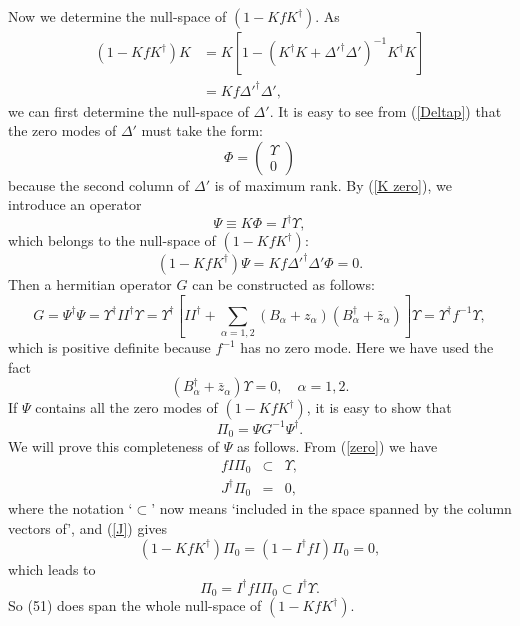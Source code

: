\documentclass[a4paper,a4paper]{article}
\begin{document}
Now we determine the null-space of $(1-K f K^\dag)$. As
\begin{equation}\label{K zero}
\begin{array}{rl}
(1-KfK^\dag)K&=K[1-(K^\dag K+\Delta'^\dag\Delta')^{-1}K^\dag K]\\
&=Kf\Delta'^\dag\Delta',
\end{array}
\end{equation}
we can first determine the null-space of $\Delta'$. It is easy to
see from (\ref{Deltap}) that the zero modes of $\Delta'$ must take
the form:
\begin{equation}
\Phi=\left(\begin{array}{c}
\Upsilon\\
0\end{array}\right)
\end{equation}
because the second column of $\Delta'$ is of maximum rank. By
(\ref{K zero}), we introduce an operator
\begin{equation}\label{Psi}
\Psi\equiv K\Phi=I^\dag\Upsilon,
\end{equation}
which belongs to the null-space of $(1-KfK^\dag)$:
\begin{equation}
(1-KfK^\dag)\Psi=Kf\Delta'^\dag\Delta'\Phi=0.
\end{equation}
Then a hermitian operator $G$ can be constructed as follows:
\begin{equation}
G=\Psi^\dag\Psi=\Upsilon^\dag II^\dag\Upsilon
=\Upsilon^\dag[II^\dag+
\sum_{\alpha=1,2}(B_\alpha+z_\alpha)(B_\alpha^\dag+\bar{z}_\alpha)]\Upsilon
=\Upsilon^\dag f^{-1}\Upsilon,
\end{equation}
which is positive definite because $f^{-1}$ has no zero mode. Here
we have used the fact
\begin{equation}
(B_\alpha^\dag+\bar{z}_\alpha)\Upsilon=0,\quad\alpha=1,2.
\end{equation}
If $\Psi$ contains all the zero modes of $(1-K f K^\dag)$, it is
easy to show that
\begin{equation}
\Pi_0=\Psi G^{-1}\Psi^\dag.
\end{equation}
We will prove this completeness of $\Psi$ as follows. From
(\ref{zero}) we have
\begin{eqnarray}
\label{fI}fI\Pi_0&\subset&\Upsilon,\\
\label{J}J^\dag\Pi_0&=&0,
\end{eqnarray}
where the notation `$\subset$' now means `included in the space
spanned by the column vectors of', and (\ref{J}) gives
\begin{equation}
(1-KfK^\dag)\Pi_0=(1-I^\dag fI)\Pi_0=0,
\end{equation}
which leads to
\begin{equation}
\Pi_0=I^\dag fI\Pi_0\subset I^\dag\Upsilon.
\end{equation}
So (51) does span the whole null-space of $(1-KfK^\dag)$.
\end{document}
